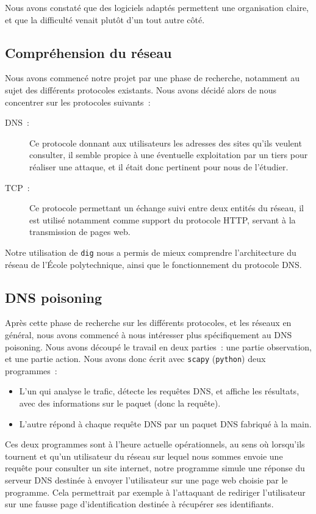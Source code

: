 \documentclass[a4paper, 12pt,twoside]{article}
\begin{document}
    Nous avons constaté que des logiciels adaptés permettent une organisation claire, et que la difficulté venait plutôt d'un tout autre côté.

    \subsection{Compréhension du réseau}

    Nous avons commencé notre projet par une phase de recherche,  notamment au sujet des différents protocoles existants. Nous avons décidé alors de nous concentrer sur les protocoles suivants~:
    \begin{description}
        \item[DNS~:] Ce protocole donnant aux utilisateurs les adresses des sites qu'ils veulent consulter, il semble propice à une éventuelle exploitation par un tiers pour réaliser une attaque, et il était donc pertinent pour nous de l'étudier.
        \item[TCP~:] Ce protocole permettant un échange suivi entre deux entités du réseau, il est utilisé notamment comme support du protocole HTTP, servant à la transmission de pages web.
    \end{description}

    Notre  utilisation de \verb!dig! nous a permis de mieux comprendre l'architecture du réseau de l'École polytechnique, ainsi que le fonctionnement du protocole DNS.

    \subsection{DNS poisoning}

    Après cette phase de recherche sur les différents protocoles, et les réseaux en général, nous avons commencé à nous intéresser plus spécifiquement au DNS poisoning. Nous avons découpé le travail en deux parties~: une partie observation, et une partie action. Nous avons donc écrit avec \verb!scapy! (\verb!python!) deux programmes~:
    \begin{itemize}[label=\color{bleu303}\textbullet{}]
        \item L'un qui analyse le trafic, détecte les requêtes DNS, et affiche les résultats, avec des informations sur le paquet (donc la requête).
        \item L'autre répond à chaque requête DNS par un paquet DNS fabriqué à la main.
    \end{itemize}

    Ces deux programmes sont à l'heure actuelle opérationnels, au sens où lorsqu'ils tournent et qu'un utilisateur du réseau sur lequel nous sommes envoie une requête pour consulter un site internet, notre programme simule une réponse du serveur DNS destinée à envoyer l'utilisateur sur une page web choisie par le programme. Cela permettrait par exemple à l'attaquant de rediriger l'utilisateur sur une fausse page d'identification destinée à récupérer ses identifiants.
\end{document}
